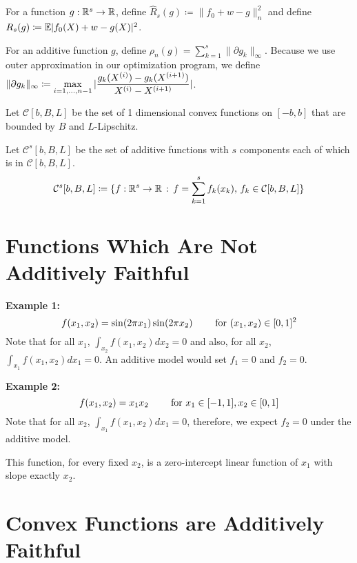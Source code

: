 \documentclass{article}
\begin{document}
For a function $g : \mathbb{R}^s \rightarrow \mathbb{R}$, define $\hat{R}_s(g) \coloneqq \| f_0 + w - g \|_n^2$ and define $R_s(g) \coloneqq \mathbb{E} | f_0(X)  + w - g(X) |^2$. 

For an additive function $g$, define $\rho_n(g) = \sum_{k=1}^s \| \partial g_k \|_\infty$. Because we use outer approximation in our optimization program, we define $\displaystyle \| \partial g_k\|_\infty \coloneqq \max_{i=1,...,n-1} |\frac{ g_k(X^{(i)}) - g_k(X^{(i+1)})}{ X^{(i)} - X^{(i+1)}}|$.

Let $\mathcal{C}[b,B,L]$ be the set of 1 dimensional convex functions on $[-b,b]$ that are bounded by $B$ and $L$-Lipschitz.

Let $\mathcal{C}^s[b,B,L]$ be the set of additive functions with $s$ components each of which is in $\mathcal{C}[b,B,L]$. 
\[
\mathcal{C}^s[b,B,L] \coloneqq \{ f : \mathbb{R}^s \rightarrow \mathbb{R} \,:\, f = \sum_{k=1}^s f_k(x_k), \, f_k \in \mathcal{C}[b,B,L] \}
\]





\section{Functions Which Are Not Additively Faithful}

\textbf{Example 1:}
\[
f(x_1, x_2) = \sin( 2\pi x_1) \sin( 2 \pi x_2) \qquad \textrm{ for } (x_1, x_2) \in [0,1]^2
\]
Note that for all $x_1$, $\int_{x_2} f(x_1, x_2) d x_2 = 0$ and also, for all $x_2$, $\int_{x_1} f(x_1, x_2) d x_1 = 0$.
An additive model would set $f_1 = 0$ and $f_2 = 0$. 

\begin{figure}[htp]
\end{figure}

\textbf{Example 2:}
\[
f(x_1, x_2) = x_1 x_2 \qquad \textrm{ for } x_1 \in [-1,1], x_2 \in [0,1]
\]
Note that for all $x_2$, $\int_{x_1} f(x_1, x_2) d x_1 = 0$, therefore, we expect $f_2 = 0$ under the additive model.

This function, for every fixed $x_2$, is a zero-intercept linear function of $x_1$ with slope exactly $x_2$.






\section{Convex Functions are Additively Faithful}
\end{document}
